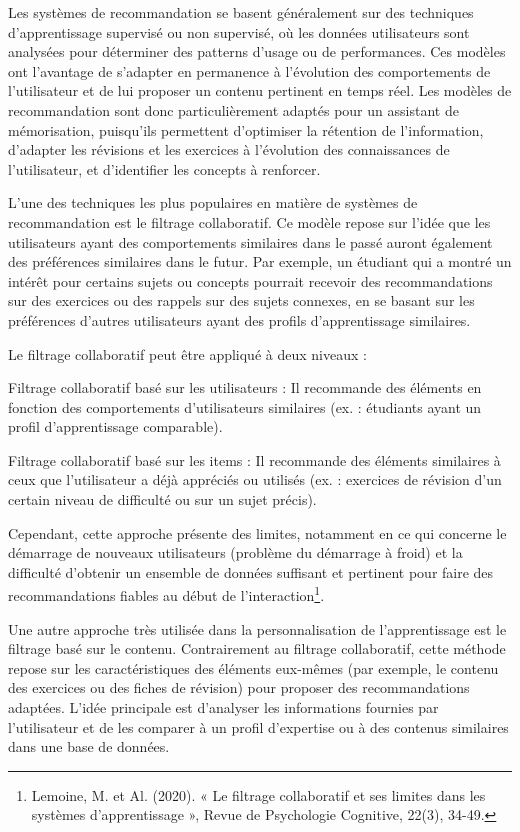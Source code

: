 \documentclass[11pt,a4paper]{report}
\begin{document}
Les systèmes de recommandation se basent généralement sur des techniques d'apprentissage supervisé ou non supervisé, où les données utilisateurs sont analysées pour déterminer des patterns d’usage ou de performances. Ces modèles ont l’avantage de s’adapter en permanence à l’évolution des comportements de l’utilisateur et de lui proposer un contenu pertinent en temps réel. Les modèles de recommandation sont donc particulièrement adaptés pour un assistant de mémorisation, puisqu’ils permettent d’optimiser la rétention de l’information, d’adapter les révisions et les exercices à l’évolution des connaissances de l’utilisateur, et d’identifier les concepts à renforcer.

L’une des techniques les plus populaires en matière de systèmes de recommandation est le filtrage collaboratif. Ce modèle repose sur l'idée que les utilisateurs ayant des comportements similaires dans le passé auront également des préférences similaires dans le futur. Par exemple, un étudiant qui a montré un intérêt pour certains sujets ou concepts pourrait recevoir des recommandations sur des exercices ou des rappels sur des sujets connexes, en se basant sur les préférences d’autres utilisateurs ayant des profils d’apprentissage similaires.

Le filtrage collaboratif peut être appliqué à deux niveaux :

Filtrage collaboratif basé sur les utilisateurs : Il recommande des éléments en fonction des comportements d’utilisateurs similaires (ex. : étudiants ayant un profil d’apprentissage comparable).

Filtrage collaboratif basé sur les items : Il recommande des éléments similaires à ceux que l’utilisateur a déjà appréciés ou utilisés (ex. : exercices de révision d’un certain niveau de difficulté ou sur un sujet précis).

Cependant, cette approche présente des limites, notamment en ce qui concerne le démarrage de nouveaux utilisateurs (problème du démarrage à froid) et la difficulté d'obtenir un ensemble de données suffisant et pertinent pour faire des recommandations fiables au début de l'interaction\footnote{Lemoine, M. et Al. (2020). « Le filtrage collaboratif et ses limites dans les systèmes d’apprentissage », Revue de Psychologie Cognitive, 22(3), 34-49.}.

Une autre approche très utilisée dans la personnalisation de l’apprentissage est le filtrage basé sur le contenu. Contrairement au filtrage collaboratif, cette méthode repose sur les caractéristiques des éléments eux-mêmes (par exemple, le contenu des exercices ou des fiches de révision) pour proposer des recommandations adaptées. L'idée principale est d'analyser les informations fournies par l’utilisateur et de les comparer à un profil d'expertise ou à des contenus similaires dans une base de données.
\end{document}

